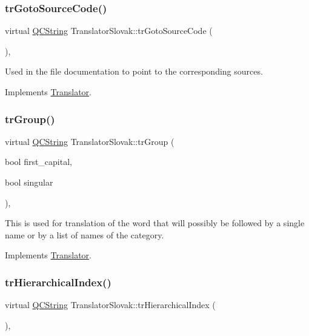 \subsubsection{\texorpdfstring{trGotoSourceCode()}{trGotoSourceCode()}}
{\footnotesize\ttfamily virtual \mbox{\hyperlink{class_q_c_string}{Q\+C\+String}} Translator\+Slovak\+::tr\+Goto\+Source\+Code (\begin{DoxyParamCaption}{ }\end{DoxyParamCaption})\hspace{0.3cm}{\ttfamily [inline]}, {\ttfamily [virtual]}}

Used in the file documentation to point to the corresponding sources. 

Implements \mbox{\hyperlink{class_translator}{Translator}}.

\mbox{\label{class_translator_slovak_a6cd2a183cb56face1a12ab6ef3c3c326}} 
\subsubsection{\texorpdfstring{trGroup()}{trGroup()}}
{\footnotesize\ttfamily virtual \mbox{\hyperlink{class_q_c_string}{Q\+C\+String}} Translator\+Slovak\+::tr\+Group (\begin{DoxyParamCaption}\item[{bool}]{first\+\_\+capital,  }\item[{bool}]{singular }\end{DoxyParamCaption})\hspace{0.3cm}{\ttfamily [inline]}, {\ttfamily [virtual]}}

This is used for translation of the word that will possibly be followed by a single name or by a list of names of the category. 

Implements \mbox{\hyperlink{class_translator}{Translator}}.

\mbox{\label{class_translator_slovak_aced8432321141564e63901913c95e01e}} 
\subsubsection{\texorpdfstring{trHierarchicalIndex()}{trHierarchicalIndex()}}
{\footnotesize\ttfamily virtual \mbox{\hyperlink{class_q_c_string}{Q\+C\+String}} Translator\+Slovak\+::tr\+Hierarchical\+Index (\begin{DoxyParamCaption}{ }\end{DoxyParamCaption})\hspace{0.3cm}{\ttfamily [inline]}, {\ttfamily [virtual]}}

